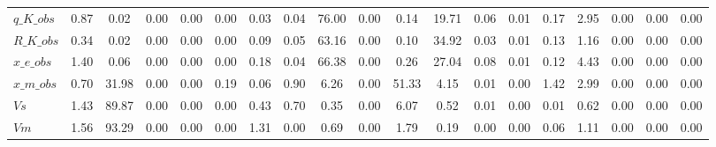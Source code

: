 \begin{center}
\begin{longtable}{lcccccccccccccccccc}
$q\_K\_obs          $	 & 	             0.87	 & 	             0.02	 & 	             0.00	 & 	             0.00	 & 	             0.00	 & 	             0.03	 & 	             0.04	 & 	            76.00	 & 	             0.00	 & 	             0.14	 & 	            19.71	 & 	             0.06	 & 	             0.01	 & 	             0.17	 & 	             2.95	 & 	             0.00	 & 	             0.00	 & 	             0.00 \\ 
$R\_K\_obs          $	 & 	             0.34	 & 	             0.02	 & 	             0.00	 & 	             0.00	 & 	             0.00	 & 	             0.09	 & 	             0.05	 & 	            63.16	 & 	             0.00	 & 	             0.10	 & 	            34.92	 & 	             0.03	 & 	             0.01	 & 	             0.13	 & 	             1.16	 & 	             0.00	 & 	             0.00	 & 	             0.00 \\ 
$x\_e\_obs          $	 & 	             1.40	 & 	             0.06	 & 	             0.00	 & 	             0.00	 & 	             0.00	 & 	             0.18	 & 	             0.04	 & 	            66.38	 & 	             0.00	 & 	             0.26	 & 	            27.04	 & 	             0.08	 & 	             0.01	 & 	             0.12	 & 	             4.43	 & 	             0.00	 & 	             0.00	 & 	             0.00 \\ 
$x\_m\_obs          $	 & 	             0.70	 & 	            31.98	 & 	             0.00	 & 	             0.00	 & 	             0.19	 & 	             0.06	 & 	             0.90	 & 	             6.26	 & 	             0.00	 & 	            51.33	 & 	             4.15	 & 	             0.01	 & 	             0.00	 & 	             1.42	 & 	             2.99	 & 	             0.00	 & 	             0.00	 & 	             0.00 \\ 
$Vs                 $	 & 	             1.43	 & 	            89.87	 & 	             0.00	 & 	             0.00	 & 	             0.00	 & 	             0.43	 & 	             0.70	 & 	             0.35	 & 	             0.00	 & 	             6.07	 & 	             0.52	 & 	             0.01	 & 	             0.00	 & 	             0.01	 & 	             0.62	 & 	             0.00	 & 	             0.00	 & 	             0.00 \\ 
$Vm                 $	 & 	             1.56	 & 	            93.29	 & 	             0.00	 & 	             0.00	 & 	             0.00	 & 	             1.31	 & 	             0.00	 & 	             0.69	 & 	             0.00	 & 	             1.79	 & 	             0.19	 & 	             0.00	 & 	             0.00	 & 	             0.06	 & 	             1.11	 & 	             0.00	 & 	             0.00	 & 	             0.00 \\ 

\end{longtable}
\end{center}
